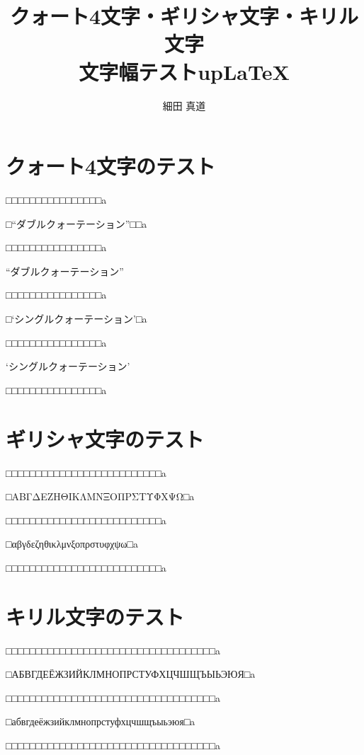 \documentclass[uplatex]{jsarticle}
\title{クォート4文字・ギリシャ文字・キリル文字 \\
  文字幅テストup\LaTeX}
\author{細田 真道}
\begin{document}
\maketitle

\section{クォート4文字のテスト}

□□□□□□□□□□□□□□□□a

□“ダブルクォーテーション”□□a

□□□□□□□□□□□□□□□□a

“ダブルクォーテーション”

□□□□□□□□□□□□□□□□a

□‘シングルクォーテーション’□a

□□□□□□□□□□□□□□□□a

‘シングルクォーテーション’

□□□□□□□□□□□□□□□□a

\section{ギリシャ文字のテスト}

□□□□□□□□□□□□□□□□□□□□□□□□□□a

□ΑΒΓΔΕΖΗΘΙΚΛΜΝΞΟΠΡΣΤΥΦΧΨΩ□a

□□□□□□□□□□□□□□□□□□□□□□□□□□a

□αβγδεζηθικλμνξοπρστυφχψω□a

□□□□□□□□□□□□□□□□□□□□□□□□□□a

\section{キリル文字のテスト}

□□□□□□□□□□□□□□□□□□□□□□□□□□□□□□□□□□□a

□АБВГДЕЁЖЗИЙКЛМНОПРСТУФХЦЧШЩЪЫЬЭЮЯ□a

□□□□□□□□□□□□□□□□□□□□□□□□□□□□□□□□□□□a

□абвгдеёжзийклмнопрстуфхцчшщъыьэюя□a

□□□□□□□□□□□□□□□□□□□□□□□□□□□□□□□□□□□a
\end{document}
